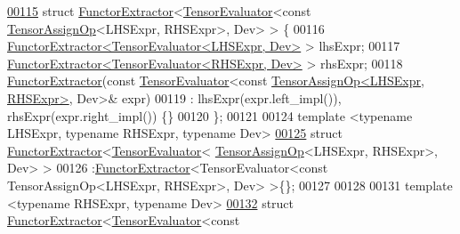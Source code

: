 \begin{DoxyCode}
\hyperlink{struct_eigen_1_1_tensor_sycl_1_1internal_1_1_functor_extractor_3_01_tensor_evaluator_3_01const_0bfc9e0269848e71715a5b777eed1a2f8}{00115} \textcolor{keyword}{struct }\hyperlink{struct_eigen_1_1_tensor_sycl_1_1internal_1_1_functor_extractor}{FunctorExtractor}<\hyperlink{struct_eigen_1_1_tensor_evaluator}{TensorEvaluator}<const 
      \hyperlink{class_eigen_1_1_tensor_assign_op}{TensorAssignOp}<LHSExpr, RHSExpr>, Dev> > \{
00116   \hyperlink{struct_eigen_1_1_tensor_sycl_1_1internal_1_1_functor_extractor}{FunctorExtractor<TensorEvaluator<LHSExpr, Dev>} > lhsExpr;
00117   \hyperlink{struct_eigen_1_1_tensor_sycl_1_1internal_1_1_functor_extractor}{FunctorExtractor<TensorEvaluator<RHSExpr, Dev>} > rhsExpr;
00118   \hyperlink{struct_eigen_1_1_tensor_sycl_1_1internal_1_1_functor_extractor}{FunctorExtractor}(\textcolor{keyword}{const} \hyperlink{struct_eigen_1_1_tensor_evaluator}{TensorEvaluator}<\textcolor{keyword}{const} 
      \hyperlink{class_eigen_1_1_tensor_assign_op}{TensorAssignOp<LHSExpr, RHSExpr>}, Dev>& expr)
00119   : lhsExpr(expr.left\_impl()), rhsExpr(expr.right\_impl()) \{\}
00120 \};
00121 
00124 \textcolor{keyword}{template} <\textcolor{keyword}{typename} LHSExpr, \textcolor{keyword}{typename} RHSExpr, \textcolor{keyword}{typename} Dev>
\hyperlink{struct_eigen_1_1_tensor_sycl_1_1internal_1_1_functor_extractor_3_01_tensor_evaluator_3_01_tensorbc577b2661bd7e03c154152e8833eb33}{00125} \textcolor{keyword}{struct }\hyperlink{struct_eigen_1_1_tensor_sycl_1_1internal_1_1_functor_extractor}{FunctorExtractor}<\hyperlink{struct_eigen_1_1_tensor_evaluator}{TensorEvaluator}<
      \hyperlink{class_eigen_1_1_tensor_assign_op}{TensorAssignOp}<LHSExpr, RHSExpr>, Dev> >
00126 :\hyperlink{struct_eigen_1_1_tensor_sycl_1_1internal_1_1_functor_extractor}{FunctorExtractor}<TensorEvaluator<const TensorAssignOp<LHSExpr, RHSExpr>, Dev> >\{\};
00127 
00128 
00131 \textcolor{keyword}{template} <\textcolor{keyword}{typename} RHSExpr, \textcolor{keyword}{typename} Dev>
\hyperlink{struct_eigen_1_1_tensor_sycl_1_1internal_1_1_functor_extractor_3_01_tensor_evaluator_3_01const_00cb481c3699f8d4e5fa68dcbf0785993}{00132} \textcolor{keyword}{struct }\hyperlink{struct_eigen_1_1_tensor_sycl_1_1internal_1_1_functor_extractor}{FunctorExtractor}<\hyperlink{struct_eigen_1_1_tensor_evaluator}{TensorEvaluator}<const 

\end{DoxyCode}
